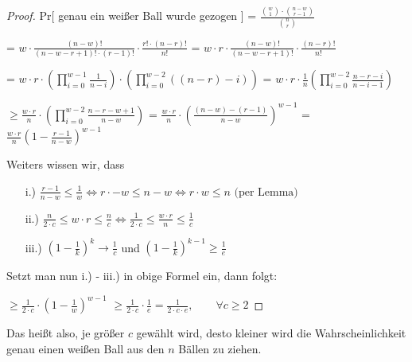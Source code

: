 \documentclass{article}
\begin{document}
\begin{proof}
  Pr[ genau ein wei{\ss}er Ball wurde gezogen ]
    = $\frac{\binom{w}{1} \cdot \binom{n - w}{r - 1}}{\binom{n}{r}}$

    = $w \cdot \frac{(n - w)!}{(n - w - r + 1)! \cdot (r - 1)!} \cdot \frac{r! \cdot (n - r)!}{n!}$
    = $w \cdot r \cdot \frac{(n - w)!}{(n - w - r + 1)!} \cdot \frac{(n - r)!}{n!}$

    = $w \cdot r \cdot \left( \prod\limits_{i = 0}^{w - 1} \frac{1}{n - i} \right) \cdot \left( \prod\limits_{i = 0}^{w - 2} \left( \left( n - r \right) - i \right) \right)$
    = $w \cdot r \cdot \frac{1}{n} \left( \prod\limits_{i = 0}^{w - 2} \frac{n - r - i}{n - i - 1} \right)$

    $\geq \frac{w \cdot r}{n} \cdot \left( \prod\limits_{i = 0}^{w - 2} \frac{n - r - w + 1}{n - w} \right)$
    = $\frac{w \cdot r}{n} \cdot \left( \frac{\left( n - w \right) - \left( r - 1 \right)}{n - w} \right)^{w - 1}$
    = $\frac{w \cdot r}{n} \left( 1 - \frac{r - 1}{n - w} \right)^{w - 1}$
   
  \bigskip
  \noindent
  Weiters wissen wir, dass
  \begin{enumerate}
    \item[i.)] $\frac{r - 1}{n - w} \leq \frac{1}{w}
        \Longleftrightarrow r \cdot  - w \leq n - w
        \Longleftrightarrow r \cdot w \leq n \text{ (per Lemma)}
      $
    \item[ii.)] $\frac{n}{2 \cdot c} \leq w \cdot r \leq \frac{n}{c}
        \Longleftrightarrow \frac{1}{2 \cdot c} \leq \frac{w \cdot r}{n} \leq \frac{1}{c}
      $
    \item[iii.)] $\left( 1 - \frac{1}{k} \right)^k \rightarrow \frac{1}{c}$ und
      $\left( 1 - \frac{1}{k} \right)^{k - 1} \geq \frac{1}{e}$
  \end{enumerate}

  \bigskip
  \noindent
  Setzt man nun i.) - iii.) in obige Formel ein, dann folgt:

  $\geq \frac{1}{2 \cdot c} \cdot \left( 1 - \frac{1}{w} \right)^{w - 1}$
  $\geq \frac{1}{2 \cdot c} \cdot \frac{1}{e} = \frac{1}{2 \cdot c \cdot e},
    \qquad \forall c \geq 2
  $
\end{proof}

\noindent
Das hei{\ss}t also, je gr{\"o}{\ss}er $c$ gew{\"a}hlt wird, desto kleiner wird die
Wahrscheinlichkeit genau einen wei{\ss}en Ball aus den $n$ B{\"a}llen zu ziehen.
\end{document}
